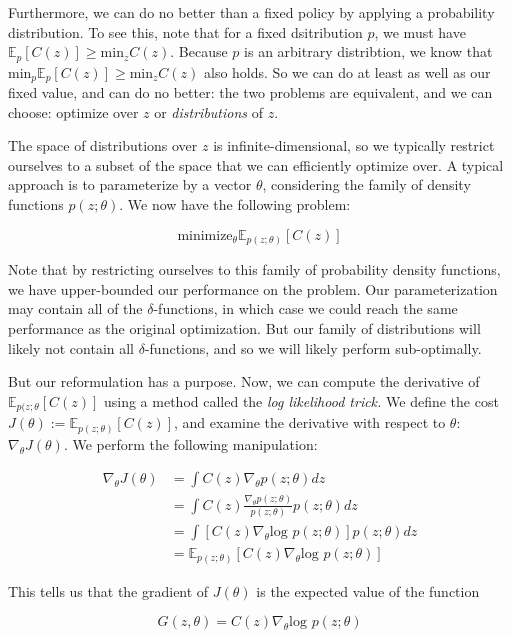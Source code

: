 \documentclass{article}[12pt]
\def\E{\mathbb{E}}
\def \E{\mathbb E}
\begin{document}
Furthermore, we can do no better than a fixed policy by applying a probability distribution. To see this, note that for a fixed dsitribution $p$, we must have $\E_p[C(z)]\geq \text{min}_zC(z)$. Because $p$ is an arbitrary distribtion, we know that $\text{min}_p\E_p[C(z)]\geq \text{min}_zC(z)$ also holds. So we can do at least as well as our fixed value, and can do no better: the two problems are equivalent, and we can choose: optimize over $z$ or \textit{distributions} of $z$.

The space of distributions over $z$ is infinite-dimensional, so we typically restrict ourselves to a subset of the space that we can efficiently optimize over. A typical approach is to parameterize by a vector $\theta$, considering the family of density functions $p(z;\theta)$. We now have the following problem:

\begin{equation}
\text{minimize}_\theta \E_{p(z;\theta)}[C(z)]
\end{equation}

Note that by restricting ourselves to this family of probability density functions, we have upper-bounded our performance on the problem. Our parameterization may contain all of the $\delta$-functions, in which case we could reach the same performance as the original optimization. But our family of distributions will likely not contain all $\delta$-functions, and so we will likely perform sub-optimally.

But our reformulation has a purpose. Now, we can compute the derivative of $\E_{p(z;\theta}[C(z)]$ using a method called the \textit{log likelihood trick.} We define the cost $J(\theta):=\E_{p(z;\theta)}[C(z)]$, and examine  the derivative with respect to $\theta$: $\nabla_\theta J(\theta)$. We perform the following manipulation:

\begin{align*}
\nabla_\theta J(\theta) &= \int C(z) \nabla_\theta p(z;\theta)dz\\
&= \int C(z) \frac{\nabla_\theta p(z;\theta)}{p(z;\theta)}p(z;\theta)dz\\
&= \int [C(z)\nabla_\theta \text{log }p(z;\theta)]p(z;\theta)dz\\
&= \E_{p(z;\theta)}[C(z)\nabla_\theta \text{log }p(z;\theta)]
\end{align*}

This tells us that the gradient of $J(\theta)$ is the expected value of the function 

\begin{equation}
G(z,\theta) = C(z)\nabla_\theta \text{log }p(z;\theta)
\end{equation}
\end{document}
